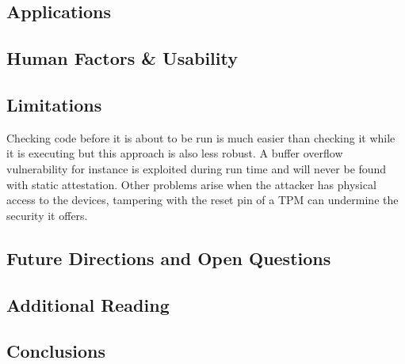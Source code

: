 \documentclass{article}
\begin{document}
\subsection{Applications}

\subsection{Human Factors \& Usability}

\subsection{Limitations}

Checking code before it is about to be run is much easier than checking it while it is executing but this approach is also less robust. A buffer overflow vulnerability for instance is exploited during run time and will never be found with static attestation. Other problems arise when the attacker has physical access to the devices, tampering with the reset pin of a TPM can undermine the security it offers. 

\subsection{Future Directions and Open Questions}

\subsection{Additional Reading}

\subsection{Conclusions}
\end{document}

